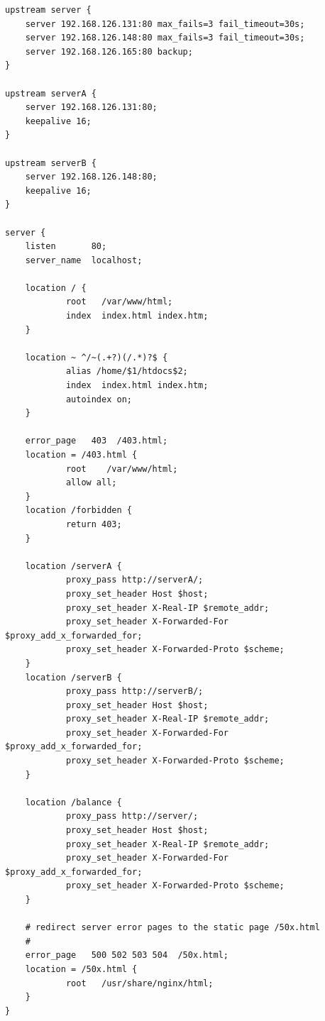 \documentclass[12pt]{article}
\begin{document}
\begin{verbatim}
upstream server {
    server 192.168.126.131:80 max_fails=3 fail_timeout=30s;
    server 192.168.126.148:80 max_fails=3 fail_timeout=30s;
    server 192.168.126.165:80 backup;
}

upstream serverA {
    server 192.168.126.131:80;
    keepalive 16;
}

upstream serverB {
    server 192.168.126.148:80;
    keepalive 16;
}

server {
    listen       80;
    server_name  localhost;

    location / {
            root   /var/www/html;
            index  index.html index.htm;
    }

    location ~ ^/~(.+?)(/.*)?$ {
            alias /home/$1/htdocs$2;
            index  index.html index.htm;
            autoindex on;
    }

    error_page   403  /403.html;
    location = /403.html {
            root    /var/www/html;
            allow all;
    }
    location /forbidden {
            return 403;
    }

    location /serverA {
            proxy_pass http://serverA/;
            proxy_set_header Host $host;
            proxy_set_header X-Real-IP $remote_addr;
            proxy_set_header X-Forwarded-For $proxy_add_x_forwarded_for;
            proxy_set_header X-Forwarded-Proto $scheme;
    }
    location /serverB {
            proxy_pass http://serverB/;
            proxy_set_header Host $host;
            proxy_set_header X-Real-IP $remote_addr;
            proxy_set_header X-Forwarded-For $proxy_add_x_forwarded_for;
            proxy_set_header X-Forwarded-Proto $scheme;
    }

    location /balance {
            proxy_pass http://server/;
            proxy_set_header Host $host;
            proxy_set_header X-Real-IP $remote_addr;
            proxy_set_header X-Forwarded-For $proxy_add_x_forwarded_for;
            proxy_set_header X-Forwarded-Proto $scheme;
    }

    # redirect server error pages to the static page /50x.html
    #
    error_page   500 502 503 504  /50x.html;
    location = /50x.html {
            root   /usr/share/nginx/html;
    }
}
\end{verbatim}


\end{document}
